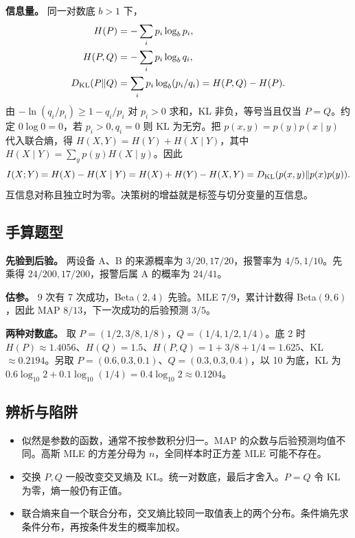 \documentclass[UTF8,a4paper,zihao=-4,fontset=fandol]{ctexart}
\begin{document}
\textbf{信息量。} 同一对数底 \(b>1\) 下，
\[
\begin{aligned}
H(P)&=-\sum_i p_i\log_b p_i,\\
H(P,Q)&=-\sum_i p_i\log_b q_i,\\
D_{\rm KL}(P\Vert Q)&=\sum_i p_i\log_b(p_i/q_i)=H(P,Q)-H(P).
\end{aligned}
\]
由 \(-\ln(q_i/p_i)\ge1-q_i/p_i\) 对 \(p_i>0\) 求和，KL 非负，等号当且仅当 \(P=Q\)。约定 \(0\log 0=0\)，若 \(p_i>0,q_i=0\) 则 KL 为无穷。把 \(p(x,y)=p(y)p(x\mid y)\) 代入联合熵，得 \(H(X,Y)=H(Y)+H(X\mid Y)\)，其中 \(H(X\mid Y)=\sum_y p(y)H(X\mid y)\)。因此
\[
 I(X;Y)=H(X)-H(X\mid Y)=H(X)+H(Y)-H(X,Y)
       =D_{\rm KL}(p(x,y)\Vert p(x)p(y)).
\]
互信息对称且独立时为零。决策树的增益就是标签与切分变量的互信息。

\subsection{手算题型}
\textbf{先验到后验。} 两设备 A、B 的来源概率为 \(3/20,17/20\)，报警率为 \(4/5,1/10\)。先乘得 \(24/200,17/200\)，报警后属 A 的概率为 \(24/41\)。
 
\textbf{估参。} 9 次有 7 次成功，Beta\((2,4)\) 先验。MLE \(7/9\)，累计计数得 Beta\((9,6)\)，因此 MAP \(8/13\)，下一次成功的后验预测 \(3/5\)。
 
\textbf{两种对数底。} 取 \(P=(1/2,3/8,1/8)\)，\(Q=(1/4,1/2,1/4)\)。底 2 时 \(H(P)\approx1.4056\)、\(H(Q)=1.5\)、\(H(P,Q)=1+3/8+1/4=1.625\)、KL \(\approx0.2194\)。另取 \(P=(0.6,0.3,0.1)\)、\(Q=(0.3,0.3,0.4)\)，以 10 为底，KL 为 \(0.6\log_{10}2+0.1\log_{10}(1/4)=0.4\log_{10}2\approx0.1204\)。

\subsection{辨析与陷阱}
\begin{itemize}[nosep,leftmargin=*]
\item 似然是参数的函数，通常不按参数积分归一。MAP 的众数与后验预测均值不同。高斯 MLE 的方差分母为 \(n\)，全同样本时正方差 MLE 可能不存在。
\item 交换 \(P,Q\) 一般改变交叉熵及 KL。统一对数底，最后才舍入。\(P=Q\) 令 KL 为零，熵一般仍有正值。
\item 联合熵来自一个联合分布，交叉熵比较同一取值表上的两个分布。条件熵先求条件分布，再按条件发生的概率加权。
\end{itemize}
\end{document}
